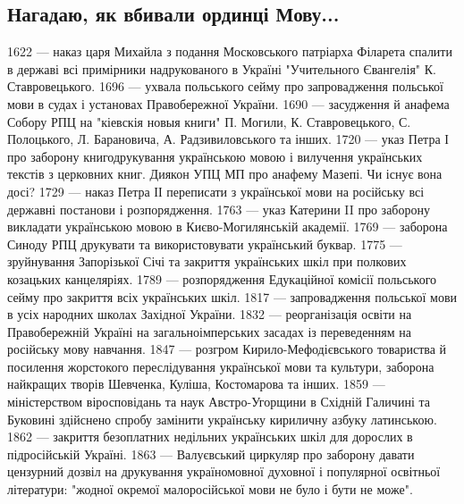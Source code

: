  
 
 
 
 

\subsection{Нагадаю, як вбивали ординці Мову...}

1622 — наказ царя Михайла з подання Московського патріарха Філарета спалити в державі всі примірники надрукованого в Україні "Учительного Євангелія" К. Ставровецького.
1696 — ухвала польського сейму про запровадження польської мови в судах і установах Правобережної України.
1690 — засудження й анафема Собору РПЦ на "кіевскія новыя книги" П. Могили, К. Ставровецького, С. Полоцького, Л. Барановича, А. Радзивиловського та інших.
1720 — указ Петра І про заборону книгодрукування українською мовою і вилучення українських текстів з церковних книг.
Диякон УПЦ МП про анафему Мазепі. Чи існує вона досі?
1729 — наказ Петра ІІ переписати з української мови на російську всі державні постанови і розпорядження.
1763 — указ Катерини II про заборону викладати українською мовою в Києво-Могилянській академії.
1769 — заборона Синоду РПЦ друкувати та використовувати український буквар.
1775 — зруйнування Запорізької Січі та закриття українських шкіл при полкових козацьких канцеляріях.
1789 — розпорядження Едукаційної комісії польського сейму про закриття всіх українських шкіл.
1817 — запровадження польської мови в усіх народних школах Західної України.
1832 — реорганізація освіти на Правобережній Україні на загальноімперських засадах із переведенням на російську мову навчання.
1847 — розгром Кирило-Мефодієвського товариства й посилення жорстокого переслідування української мови та культури, заборона найкращих творів Шевченка, Куліша, Костомарова та інших.
1859 — міністерством віросповідань та наук Австро-Угорщини в Східній Галичині та Буковині здійснено спробу замінити українську кириличну азбуку латинською.
1862 — закриття безоплатних недільних українських шкіл для дорослих в підросійській Україні.
1863 — Валуєвський циркуляр про заборону давати цензурний дозвіл на друкування україномовної духовної і популярної освітньої літератури: "жодної окремої малоросійської мови не було і бути не може".
